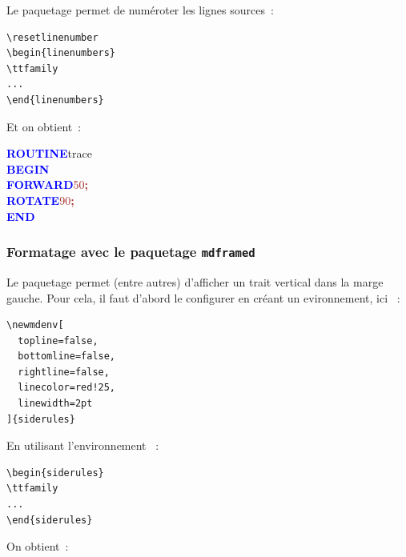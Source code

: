 Le paquetage  permet de numéroter les lignes sources~:
\begin{verbatim}
\resetlinenumber
\begin{linenumbers}
\ttfamily
...
\end{linenumbers}
\end{verbatim}

Et on obtient~:

\resetlinenumber
\begin{linenumbers}\singlespacing\ttfamily
\textcolor{blue}{\bf ROUTINE}\hspace*{.6em}t{}r{}a{}c{}e{} \\
\textcolor{blue}{\bf BEGIN} \\
\hspace*{1.2em}\textcolor{blue}{\bf FORWARD}\hspace*{.6em}\textcolor{brown}{5{}0{}}\textcolor{brown}{\bf ;} \\
\hspace*{1.2em}\textcolor{blue}{\bf ROTATE}\hspace*{.6em}\textcolor{brown}{9{}0{}}\textcolor{brown}{\bf ;} \\
\textcolor{blue}{\bf END}
\end{linenumbers}

\subsubsection{Formatage avec le paquetage \texttt{mdframed}}

Le paquetage  permet (entre autres) d'afficher un trait vertical dans la marge gauche. Pour cela, il faut d'abord le configurer en créant un evironnement, ici ~:

\begin{verbatim}
\newmdenv[
  topline=false,
  bottomline=false,
  rightline=false,
  linecolor=red!25,
  linewidth=2pt
]{siderules}
\end{verbatim}

En utilisant l'environnement ~:

\begin{verbatim}
\begin{siderules}
\ttfamily
...
\end{siderules}
\end{verbatim}

On obtient~:

